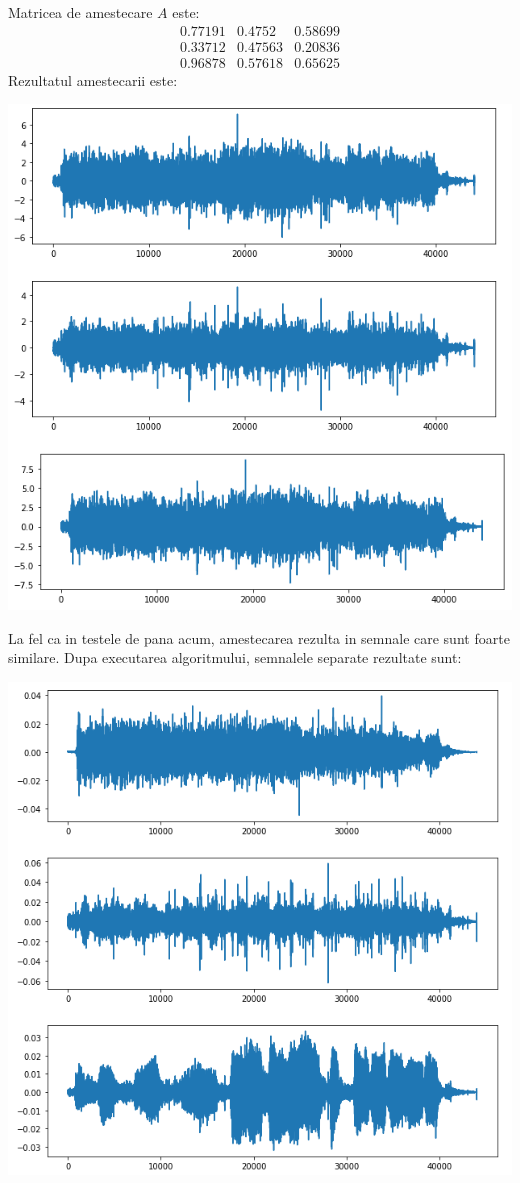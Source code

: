 \documentclass[12pt]{article}
\begin{document}
 Matricea de amestecare $A$ este:
\[
 \begin{matrix}
	0.77191 & 0.4752 &  0.58699 \\
	0.33712 & 0.47563 & 0.20836 \\
	0.96878 & 0.57618 & 0.65625
 \end{matrix}
\]
Rezultatul amestecarii este:
\begin{center}
	\includegraphics[scale=1]{three_mixed}
 \end{center}

 La fel ca in testele de pana acum, amestecarea rezulta in semnale care sunt foarte similare. Dupa executarea algoritmului, semnalele separate rezultate sunt:
\begin{center}
	\includegraphics[scale=1]{three_separated}
 \end{center}
\end{document}
